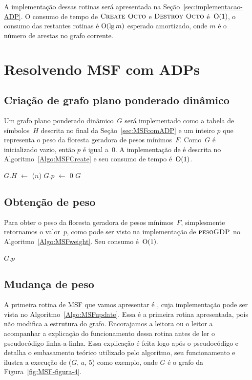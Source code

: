 A implementação dessas rotinas será apresentada na Seção~\ref{sec:implementacao-ADP}.
O consumo de tempo de $\text{\scshape Create Octo}$ e $\text{\scshape Destroy Octo}$ é~$\mathrm{O}(1)$, o consumo das restantes rotinas é $\mathrm{O}(\lg m)$ esperado amortizado, onde $m$ é o número de arestas no grafo corrente.

\section{Resolvendo MSF com ADPs}

\subsection{Criação de grafo plano ponderado dinâmico}

Um grafo plano ponderado dinâmico~$G$ será implementado como a tabela de símbolos~$H$ descrita no final da Seção~\ref{sec:MSFcomADP} e um inteiro $p$ que representa o peso da floresta geradora de pesos mínimos~$F$.
Como~$G$ é inicializado vazio, então $p$ é igual a~$0$.
A implementação de \MSFCreate{} é descrita no Algoritmo~\ref{Algo:MSFCreate} e seu consumo de tempo é~$\mathrm{O}(1)$.

\begin{algorithm}[htb]
\caption{\MSFCreate($n$)}
\label{Algo:MSFCreate}
\begin{algorithmic}[1]
\State $G.H$ $\gets$ \hashCreate($n$)
\State $G.p$ $\gets$ $0$
\State \Return $G$
\end{algorithmic}
\end{algorithm}

\subsection{Obtenção de peso}

Para obter o peso da floresta geradora de pesos mínimos~$F$, simplesmente retornamos o valor~$p$, como pode ser visto na implementação de $\text{\scshape pesoGDP}$ no Algoritmo~\ref{Algo:MSFweight}.
Seu consumo é~$\mathrm{O}(1)$.
\begin{algorithm}[htb]
\caption{\MSFweight($G$)}
\label{Algo:MSFweight}
\begin{algorithmic}[1]
\State \Return $G$.$p$
\end{algorithmic}
\end{algorithm}

\subsection{Mudança de peso}
A primeira rotina de MSF que vamos apresentar é \MSFupdate{}, cuja implementação pode ser vista no Algoritmo~\ref{Algo:MSFupdate}.
Essa é a primeira rotina apresentada, pois não modifica a estrutura do grafo.
Encorajamos a leitora ou o leitor a acompanhar a explicação do funcionamento dessa rotina antes de ler o pseudocódigo linha-a-linha.
Essa explicação é feita logo após o pseudocódigo e detalha o embasamento teórico utilizado pelo algoritmo, seu funcionamento e ilustra a execução de \MSFupdate($G$, $a$, $5$) como exemplo, onde $G$ é o grafo da Figura~\ref{fig:MSF-figura-4}.


